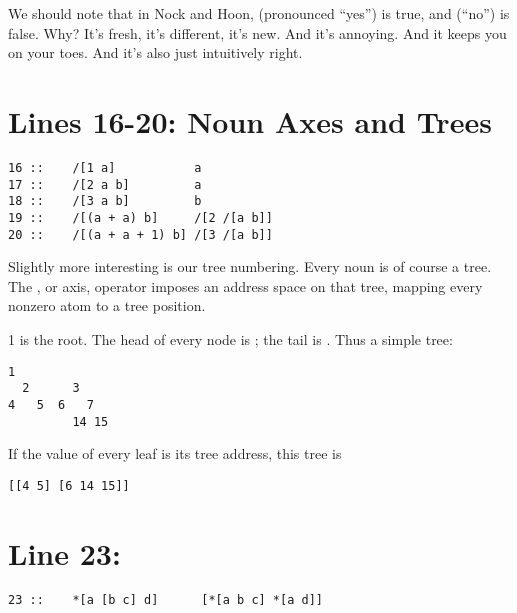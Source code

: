 We should note that in Nock and Hoon,  (pronounced ``yes'') is true, and 
(``no'') is false.  Why?  It's fresh, it's different, it's new.  And it's
annoying.  And it keeps you on your toes.  And it's also just intuitively
right.

\section{Lines 16-20: Noun Axes and Trees}

\begin{framed_shaded}
\begin{Verbatim}[fontsize=\relsize{-2.5},commandchars=\\\{\}]
16 ::    /[1 a]           a
17 ::    /[2 a b]         a
18 ::    /[3 a b]         b
19 ::    /[(a + a) b]     /[2 /[a b]]
20 ::    /[(a + a + 1) b] /[3 /[a b]]
\end{Verbatim}
\end{framed_shaded}
Slightly more interesting is our tree numbering.  Every noun is of course a
tree.  The \kode{/}, or axis, operator imposes an address space on that tree,
mapping every nonzero atom to a tree position.

1 is the root.  The head of every node  is ; the tail is .  Thus a
simple tree:

\begin{framed_shaded}
\begin{Verbatim}[fontsize=\relsize{-2.5},commandchars=\\\{\}]
     1
  2      3
4   5  6   7
         14 15
\end{Verbatim}
\end{framed_shaded}
If the value of every leaf is its tree address, this tree is

\begin{framed_shaded}
\begin{Verbatim}[fontsize=\relsize{-2.5},commandchars=\\\{\}]
  [[4 5] [6 14 15]]
\end{Verbatim}
\end{framed_shaded}

\section{Line 23:}

\begin{framed_shaded}
\begin{Verbatim}[fontsize=\relsize{-2.5},commandchars=\\\{\}]
23 ::    *[a [b c] d]      [*[a b c] *[a d]]
\end{Verbatim}
\end{framed_shaded}

